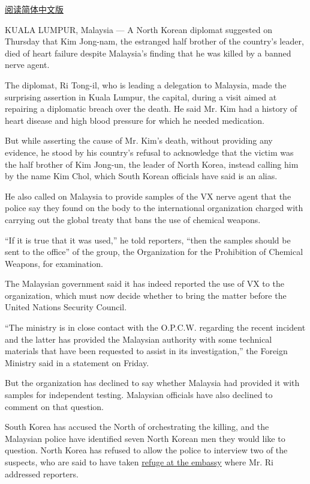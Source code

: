 \href{http://cn.nytimes3xbfgragh.onion/asia-pacific/20170303/kim-jong-nam-assassination-north-korea-visa-malaysia/}{阅读简体中文版}

KUALA LUMPUR, Malaysia --- A North Korean diplomat suggested on Thursday
that Kim Jong-nam, the estranged half brother of the country's leader,
died of heart failure despite Malaysia's finding that he was killed by a
banned nerve agent.

The diplomat, Ri Tong-il, who is leading a delegation to Malaysia, made
the surprising assertion in Kuala Lumpur, the capital, during a visit
aimed at repairing a diplomatic breach over the death. He said Mr. Kim
had a history of heart disease and high blood pressure for which he
needed medication.

But while asserting the cause of Mr. Kim's death, without providing any
evidence, he stood by his country's refusal to acknowledge that the
victim was the half brother of Kim Jong-un, the leader of North Korea,
instead calling him by the name Kim Chol, which South Korean officials
have said is an alias.

He also called on Malaysia to provide samples of the VX nerve agent that
the police say they found on the body to the international organization
charged with carrying out the global treaty that bans the use of
chemical weapons.

``If it is true that it was used,'' he told reporters, ``then the
samples should be sent to the office'' of the group, the Organization
for the Prohibition of Chemical Weapons, for examination.

The Malaysian government said it has indeed reported the use of VX to
the organization, which must now decide whether to bring the matter
before the United Nations Security Council.

``The ministry is in close contact with the O.P.C.W. regarding the
recent incident and the latter has provided the Malaysian authority with
some technical materials that have been requested to assist in its
investigation,'' the Foreign Ministry said in a statement on Friday.

But the organization has declined to say whether Malaysia had provided
it with samples for independent testing. Malaysian officials have also
declined to comment on that question.

South Korea has accused the North of orchestrating the killing, and the
Malaysian police have identified seven North Korean men they would like
to question. North Korea has refused to allow the police to interview
two of the suspects, who are said to have taken
\href{https://www.nytimes3xbfgragh.onion/2017/03/01/world/asia/malaysia-kim-jong-nam-embassy-immunity.html}{refuge
at the embassy} where Mr. Ri addressed reporters.


